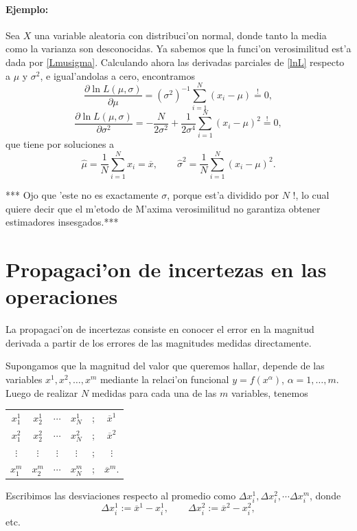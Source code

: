\documentclass[a4paper]{report}
\begin{document}
\paragraph{Ejemplo:} Sea $X$ una variable aleatoria con distribuci'on normal, donde tanto la media como la varianza son desconocidas. Ya sabemos que la funci'on verosimilitud est'a dada por \eqref{Lmusigma}. Calculando ahora las derivadas parciales de \eqref{lnL} respecto a $\mu$ y $\sigma^2$, e igual'andolas a cero, encontramos
\begin{equation}
\frac{\partial\ln L(\mu,\sigma)}{\partial\mu}=(\sigma^2)^{-1}\sum_{i=1}^N(x_i-\mu)\stackrel{!}{=}0,
\end{equation}
\begin{equation}
\frac{\partial\ln L(\mu,\sigma)}{\partial\sigma^2}=-\frac{N}{2\sigma^2}+\frac{1}{2\sigma^4}\sum_{i=1}^N(x_i-\mu)^2\stackrel{!}{=}0,
\end{equation}
que tiene por soluciones a
\begin{equation}
\hat{\mu}=\frac{1}{N}\sum_{i=1}^Nx_i=\overline{x}, \qquad \hat{\sigma}^2=\frac{1}{N}\sum_{i=1}^N(x_i-\mu)^2.
\end{equation}

*** Ojo que 'este no es exactamente $\sigma$, porque est'a dividido por $N$ !, lo cual quiere decir que el m'etodo de M'axima verosimilitud no garantiza obtener estimadores insesgados.***


\section{Propagaci'on de incertezas en las operaciones}

La propagaci'on de incertezas consiste en conocer el error en la magnitud derivada a partir de los errores de las magnitudes medidas directamente.

Supongamos que la magnitud del valor que queremos hallar, depende de las variables $x^1, x^2, \dots, x^m$  mediante la relaci'on funcional $y=f(x^\alpha)$, $\alpha=1,\dots,m$. Luego de realizar $N$ medidas para cada una de las $m$ variables, tenemos
\begin{center}
\begin{tabular}{cccccc}
$x^1_1$ & $x^1_2$ & $\cdots$ & $x^1_N$ & ; & $\overline{x}^1$ \\ 
$x^2_1$ & $x^2_2$ & $\cdots$ & $x^2_N$ & ; & $\overline{x}^2$ \\ 
$\vdots$ & $\vdots$ & $\vdots$ & $\vdots$ & ; & $\vdots$ \\ 
$x^m_1$ & $x^m_2$ & $\cdots$ & $x^m_N$ & ; & $\overline{x}^m$.
\end{tabular} 
\end{center}
Escribimos las desviaciones respecto al promedio como $\Delta x^1_i, \Delta x^2_i, \cdots \Delta x^m_i$, donde
\begin{equation}
\Delta x^1_i:=\overline{x}^1-x_i^1, \qquad \Delta x^2_i:=\overline{x}^2-x_i^2,
\end{equation}
etc.
\end{document}
